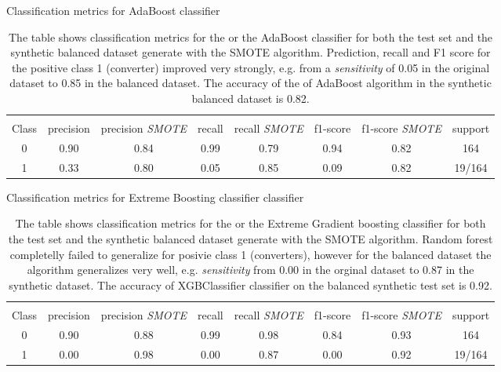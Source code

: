 \documentclass[11pt]{article}
\theoremstyle{definition}
\theoremstyle{remark}
\begin{document}
\begin{table}[H]
\caption{Classification metrics for AdaBoost classifier} \label{tab:ada_smote} 
\begin{center} 
\begin{tabular}{cccccccc}
\hline
\multicolumn{1}{c}{} \\
Class & precision & precision \textit{SMOTE}& recall & recall \textit{SMOTE}& f1-score & f1-score \textit{SMOTE} & support     \\
\hline
0 & 0.90  & 0.84  & 0.99   & 0.79 &  0.94   & 0.82  &  164 \\
1 & 0.33  & 0.80 &  0.05  &  0.85 &  0.09   & 0.82   & 19/164 \\
\hline
\end{tabular}
\caption{The table shows classification metrics for the or the AdaBoost classifier for both the test set and the synthetic balanced dataset generate with the SMOTE algorithm. Prediction, recall and F1 score for the positive class 1 (converter) improved very strongly, e.g. from a \emph{sensitivity} of 0.05 in the original dataset to 0.85 in the balanced dataset. The accuracy of the of AdaBoost algorithm in the synthetic balanced dataset is 0.82.}
\end{center}
\end{table}

\begin{table}[H]
\caption{Classification metrics for Extreme Boosting classifier classifier} \label{tab:xgb_smote} 
\begin{center} 
\begin{tabular}{cccccccc}
\hline
\multicolumn{1}{c}{} \\
Class & precision & precision \textit{SMOTE}& recall & recall \textit{SMOTE}& f1-score & f1-score \textit{SMOTE} & support     \\
\hline
0 & 0.90  & 0.88  & 0.99   & 0.98 &  0.84   & 0.93  &  164 \\
1 & 0.00  & 0.98 &  0.00  &  0.87 &  0.00   & 0.92   & 19/164 \\
\hline
\end{tabular}
\caption{The table shows classification metrics for the or the Extreme Gradient boosting classifier for both the test set and the synthetic balanced dataset generate with the SMOTE algorithm. Random forest completelly failed to generalize for posivie class 1 (converters), however for the balanced dataset the algorithm generalizes very well, e.g. \emph{sensitivity} from 0.00 in the orginal dataset to 0.87 in the synthetic dataset. The accuracy of XGBClassifier classifier on the balanced synthetic test set is 0.92.}
\end{center}
\end{table}
\end{document}

